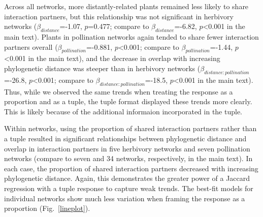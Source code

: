 \documentclass[12pt]{article}
\begin{document}
\begin{spacing}{1.0}
    Across all networks, more distantly-related plants remained less likely
    to share interaction partners, but this relationship was not significant 
    in herbivory networks ($\beta_{distance}$=-1.07, $p$=0.477; compare to 
    $\beta_{distance}$=-6.82, $p$\textless0.001 in the main text). Plants in pollination networks again tended to share fewer interaction partners overall ($\beta_{pollination}$=-0.881, $p$\textless0.001; compare to $
    \beta_{pollination}$=-1.44, $p$\textless0.001 in the main text), and the decrease in overlap with increasing phylogenetic distance was steeper than in herbivory networks ($\beta_{distance:pollination}$=-26.8, $p$\textless0.001; compare to $\beta_{distance:pollination}$=-18.5, $p$\textless0.001 in the main text). Thus, while we observed the same trends when treating the response as a proportion and as a tuple, the tuple format displayed these trends more clearly. This is likely because of the additional informaion incorporated in the tuple.


    Within networks, using the proportion of shared interaction partners rather than a tuple resulted in significant relationships between phylogenetic distance and overlap in interaction partners in five herbivory networks and seven pollination networks (compare to seven and 34 networks, respectively, in the main text). In each case, the proportion of shared interaction partners decreased with increasing phylogenetic distance. Again, this demonstrates the greater power of a Jaccard regression with a tuple response to capture weak trends. The best-fit models for individual networks show much less variation when framing the response as a proportion (Fig.~\ref{lineplot}).



\end{spacing}
\end{document}
